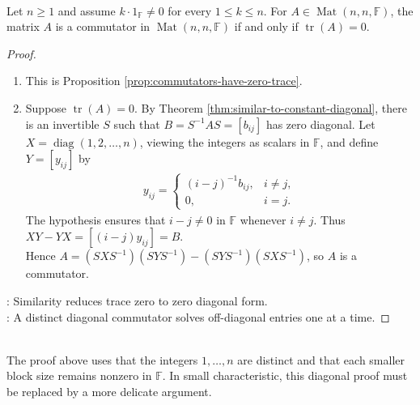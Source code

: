 \begin{theorem} \label{thm:shoda-trace-zero-commutators} \\
Let $n\geq1$ and assume $k\cdot1_{\mathbb{F}}\neq0$ for every $1\leq k\leq n$. For $A\in\operatorname{Mat}(n,n,\mathbb{F})$, the matrix $A$ is a commutator in $\operatorname{Mat}(n,n,\mathbb{F})$ if and only if $\operatorname{tr}(A)=0$.
\begin{proof}
\begin{enumerate}[label=\roman*.]
\setlength{\itemsep}{0pt}
\item[$(\Rightarrow)$] This is Proposition \ref{prop:commutators-have-zero-trace}.
\item[$(\Leftarrow)$] Suppose $\operatorname{tr}(A)=0$. By Theorem \ref{thm:similar-to-constant-diagonal}, there is an invertible $S$ such that $B=S^{-1}AS=[b_{ij}]$ has zero diagonal. Let $X=\operatorname{diag}(1,2,\ldots,n)$, viewing the integers as scalars in $\mathbb{F}$, and define $Y=[y_{ij}]$ by
\begin{align}
y_{ij}=
\begin{cases}
(i-j)^{-1}b_{ij}, & i\neq j,\\
0, & i=j.
\end{cases}
\nonumber
\end{align}
The hypothesis ensures that $i-j\neq0$ in $\mathbb{F}$ whenever $i\neq j$. Thus $XY-YX=[(i-j)y_{ij}]=B$.\\
Hence $A=(SXS^{-1})(SYS^{-1})-(SYS^{-1})(SXS^{-1})$, so $A$ is a commutator.
\end{enumerate}
: Similarity reduces trace zero to zero diagonal form.\\
: A distinct diagonal commutator solves off-diagonal entries one at a time.
\end{proof}
\end{theorem}

\begin{remark} \label{rem:shoda-field-hypothesis} \\
The proof above uses that the integers $1,\ldots,n$ are distinct and that each smaller block size remains nonzero in $\mathbb{F}$. In small characteristic, this diagonal proof must be replaced by a more delicate argument.
\end{remark}

